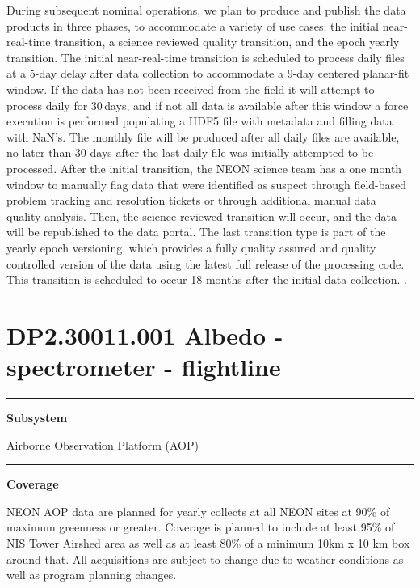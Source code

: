 \documentclass[]{article}
\begin{document}
During subsequent nominal operations, we plan to produce and publish the
data products in three phases, to accommodate a variety of use cases:
the initial near-real-time transition, a science reviewed quality
transition, and the epoch yearly transition. The initial near-real-time
transition is scheduled to process daily files at a 5-day delay after
data collection to accommodate a 9-day centered planar-fit window. If
the data has not been received from the field it will attempt to process
daily for 30\,days, and if not all data is available after this window a
force execution is performed populating a HDF5 file with metadata and
filling data with NaN's. The monthly file will be produced after all
daily files are available, no later than 30 days after the last daily
file was initially attempted to be processed. After the initial
transition, the NEON science team has a one month window to manually
flag data that were identified as suspect through field-based problem
tracking and resolution tickets or through additional manual data
quality analysis. Then, the science-reviewed transition will occur, and
the data will be republished to the data portal. The last transition
type is part of the yearly epoch versioning, which provides a fully
quality assured and quality controlled version of the data using the
latest full release of the processing code. This transition is scheduled
to occur 18 months after the initial data collection. \newpage
.

\section{DP2.30011.001 Albedo - spectrometer -
flightline}\label{dp2.30011.001-albedo---spectrometer---flightline}

\begin{center}\rule{0.5\linewidth}{\linethickness}\end{center}

\textbf{Subsystem}

Airborne Observation Platform (AOP)

\begin{center}\rule{0.5\linewidth}{\linethickness}\end{center}

\textbf{Coverage}

NEON AOP data are planned for yearly collects at all NEON sites at 90\%
of maximum greenness or greater. Coverage is planned to include at least
95\% of NIS Tower Airshed area as well as at least 80\% of a minimum
10km x 10 km box around that. All acquisitions are subject to change due
to weather conditions as well as program planning changes.
\end{document}
